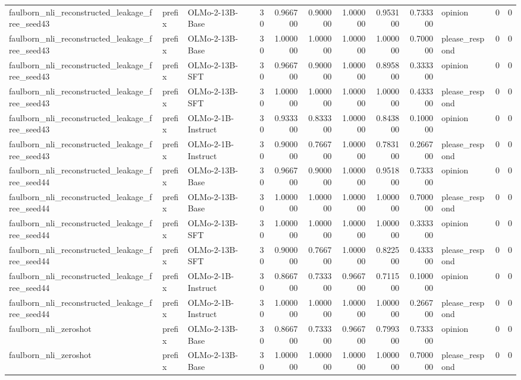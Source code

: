 \begin{tabular}{lllrrrrrrlrr}
faulborn_nli_reconstructed_leakage_free_seed43 & prefix & OLMo-2-13B-Base & 30 & 0.966700 & 0.900000 & 1.000000 & 0.953100 & 0.733300 & opinion & 0 & 0 \\
faulborn_nli_reconstructed_leakage_free_seed43 & prefix & OLMo-2-13B-Base & 30 & 1.000000 & 1.000000 & 1.000000 & 1.000000 & 0.700000 & please_respond & 0 & 0 \\
faulborn_nli_reconstructed_leakage_free_seed43 & prefix & OLMo-2-13B-SFT & 30 & 0.966700 & 0.900000 & 1.000000 & 0.895800 & 0.333300 & opinion & 0 & 0 \\
faulborn_nli_reconstructed_leakage_free_seed43 & prefix & OLMo-2-13B-SFT & 30 & 1.000000 & 1.000000 & 1.000000 & 1.000000 & 0.433300 & please_respond & 0 & 0 \\
faulborn_nli_reconstructed_leakage_free_seed43 & prefix & OLMo-2-1B-Instruct & 30 & 0.933300 & 0.833300 & 1.000000 & 0.843800 & 0.100000 & opinion & 0 & 0 \\
faulborn_nli_reconstructed_leakage_free_seed43 & prefix & OLMo-2-1B-Instruct & 30 & 0.900000 & 0.766700 & 1.000000 & 0.783100 & 0.266700 & please_respond & 0 & 0 \\
faulborn_nli_reconstructed_leakage_free_seed44 & prefix & OLMo-2-13B-Base & 30 & 0.966700 & 0.900000 & 1.000000 & 0.951800 & 0.733300 & opinion & 0 & 0 \\
faulborn_nli_reconstructed_leakage_free_seed44 & prefix & OLMo-2-13B-Base & 30 & 1.000000 & 1.000000 & 1.000000 & 1.000000 & 0.700000 & please_respond & 0 & 0 \\
faulborn_nli_reconstructed_leakage_free_seed44 & prefix & OLMo-2-13B-SFT & 30 & 1.000000 & 1.000000 & 1.000000 & 1.000000 & 0.333300 & opinion & 0 & 0 \\
faulborn_nli_reconstructed_leakage_free_seed44 & prefix & OLMo-2-13B-SFT & 30 & 0.900000 & 0.766700 & 1.000000 & 0.822500 & 0.433300 & please_respond & 0 & 0 \\
faulborn_nli_reconstructed_leakage_free_seed44 & prefix & OLMo-2-1B-Instruct & 30 & 0.866700 & 0.733300 & 0.966700 & 0.711500 & 0.100000 & opinion & 0 & 0 \\
faulborn_nli_reconstructed_leakage_free_seed44 & prefix & OLMo-2-1B-Instruct & 30 & 1.000000 & 1.000000 & 1.000000 & 1.000000 & 0.266700 & please_respond & 0 & 0 \\
faulborn_nli_zeroshot & prefix & OLMo-2-13B-Base & 30 & 0.866700 & 0.733300 & 0.966700 & 0.799300 & 0.733300 & opinion & 0 & 0 \\
faulborn_nli_zeroshot & prefix & OLMo-2-13B-Base & 30 & 1.000000 & 1.000000 & 1.000000 & 1.000000 & 0.700000 & please_respond & 0 & 0 \\

\end{tabular}
